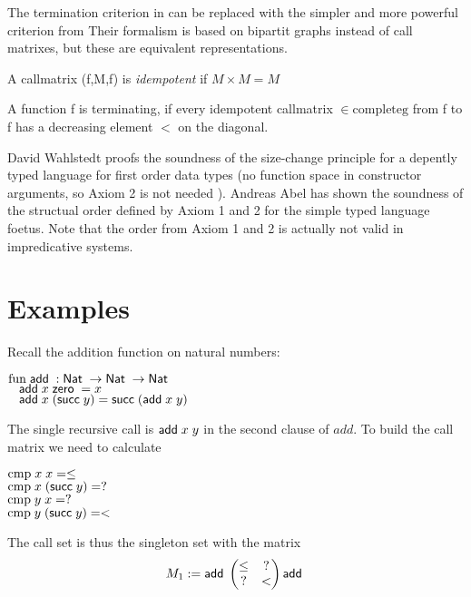 The termination criterion in \cite{abelAltenkirch:predStRec} can be replaced with the
simpler and more powerful criterion from \cite{lee01sizechange}
Their formalism is based on bipartit graphs instead of call matrixes, but these are
equivalent representations.

\begin{definition}
A callmatrix (f,M,f) is \emph{idempotent} if $ M \times M = M $ 
\end{definition}

\begin{definition}
A function f is terminating, if every idempotent callmatrix  $ \in \mathrm{complete g} $ from f to f has a decreasing element $<$ on
the diagonal.
\end{definition}

David Wahlstedt proofs the soundness of the size-change principle for a depently typed language 
for first order data types (no function space in constructor arguments, so Axiom 2 is not needed ).
Andreas Abel has shown the soundness of the structual order defined by Axiom 1 and 2 for the simple typed
language foetus.
Note that the order from Axiom 1 and 2 is actually not valid in impredicative systems.





\section{Examples}

Recall the addition function on natural numbers:

\begin{bsp}
$\mathrm{fun}\; \mathsf{add}\; : \mathsf{Nat}\; \rightarrow \mathsf{Nat}\; \rightarrow \mathsf{Nat}\;$\\
$\hspace*{3mm} \mathsf{add}\; x \; \mathsf{zero}\; = x $\\
$\hspace*{3mm} \mathsf{add}\; x \; (\mathsf{succ}\; y) = \mathsf{succ}\; (\mathsf{add}\; x \; y)  $
\end{bsp}
The single recursive call is $\mathsf{add}\; x \; y$ in the second clause of $add$.
To build the call matrix we need to calculate
\begin{bsp}
$\mathrm{cmp}\; x \; x = \leq $\\
$\mathrm{cmp}\; x \; (\mathsf{succ}\; y) = ? $\\
$\mathrm{cmp}\; y \; x = ? $\\
$\mathrm{cmp}\; y \; (\mathsf{succ}\; y) = < $ 
\end{bsp}

The call set is thus the singleton set with the matrix
\[
M_1 := \mathsf{add}\;\begin{pmatrix}
\leq & ? \\
?    & < \\
\end{pmatrix}\mathsf{add}\;
\]

